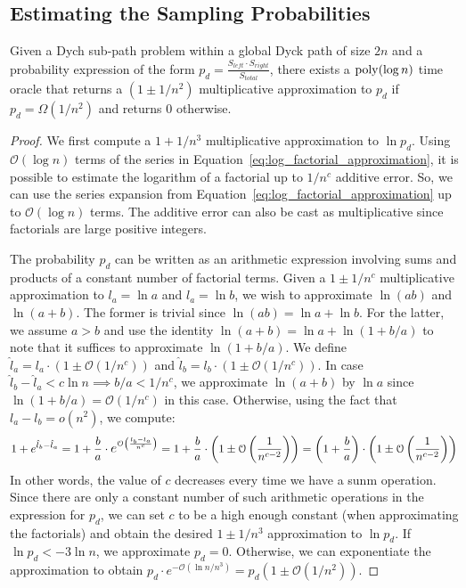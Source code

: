\subsection{Estimating the Sampling Probabilities}%
\label{sec:computing_probabilities}
\begin{lemma}
\label{lem:probability_approximation_oracle}
Given a Dych sub-path problem within a global Dyck path of size $2n$ and a probability expression of the form
$p_d = \frac{S_{left}\cdot S_{right}}{S_{total}}$, there exists a $\mathrm{poly}(\log n)$ time oracle that returns a
$\left( 1\pm 1/n^2\right)$ multiplicative approximation to $p_d$ if $p_d = \Omega(1/n^2)$ and returns $0$ otherwise.
\end{lemma}
\begin{proof}
We first compute a $1+1/n^3$ multiplicative approximation to $\ln p_d$.
Using $\mathcal O(\log n)$ terms of the series in Equation~\ref{eq:log_factorial_approximation},
it is possible to estimate the logarithm of a factorial up to $1/n^c$ additive error.
So, we can use the series expansion from Equation~\ref{eq:log_factorial_approximation} up to $\mathcal O(\log n)$ terms.
The additive error can also be cast as multiplicative since factorials are large positive integers.

The probability $p_d$ can be written as an arithmetic expression involving sums and products of a constant number of factorial terms.
Given a $1\pm1/n^c$ multiplicative approximation to $l_a = \ln a$ and $l_a = \ln b$, we wish to approximate $\ln(ab)$ and $\ln(a+b)$.
The former is trivial since $\ln(ab) = \ln a + \ln b$.
For the latter, we assume $a>b$ and use the identity $\ln(a+b) = \ln a + \ln(1+b/a)$ to note that it suffices to approximate $\ln(1+b/a)$.
We define $\hat l_a = l_a\cdot(1\pm \mathcal O(1/n^c))$ and $\hat l_b = l_b\cdot(1\pm \mathcal O(1/n^c))$.
In case $\hat l_b-\hat l_a <c\ln n\implies b/a < 1/n^c$, we approximate $\ln(a+b)$ by $\ln a$ since $\ln(1+b/a) = \mathcal O(1/n^c)$ in this case.
Otherwise, using the fact that $l_a-l_b = o(n^2)$, we compute:
\[
1+e^{\hat l_b-\hat l_a} = 1+\frac ba\cdot \mathlarger e^{\mathcal O\left( \frac{l_b-l_a}{n^c}\right)}
= 1+\frac ba\cdot\left( 1 \pm \mathcal O\left( \frac{1}{n^{c-2}} \right)\right)
= \left( 1+\frac ba\right)\cdot\left( 1 \pm \mathcal O\left( \frac{1}{n^{c-2}} \right)\right)
\]
In other words, the value of $c$ decreases every time we have a sunm operation.
Since there are only a constant number of such arithmetic operations in the expression for $p_d$,
we can set $c$ to be a high enough constant (when approximating the factorials) and obtain the desired $1\pm1/n^3$ approximation to $\ln p_d$.
If $\ln p_d < -3\ln n$, we approximate $p_d = 0$.
Otherwise, we can exponentiate the approximation to obtain $p_d\cdot e^{-\mathcal O(\ln n/n^3)} = p_d\left( 1 \pm \mathcal O(1/n^2)\right)$.
\end{proof}



